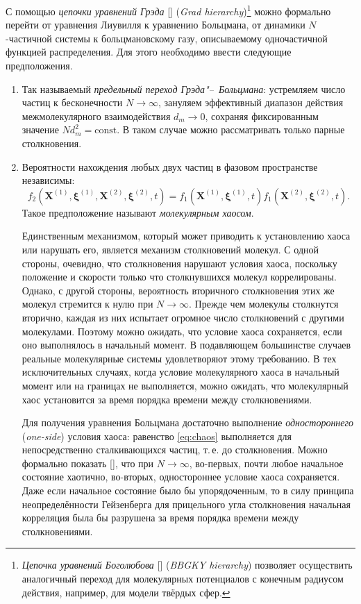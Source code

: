 С помощью \textit{цепочки уравнений Грэда} [] (\textit{Grad hierarchy})\footnote{
	\textit{Цепочка уравнений Боголюбова} [] (\textit{BBGKY hierarchy}) позволяет осуществить аналогичный переход
	для молекулярных потенциалов с конечным радиусом действия, например, для модели твёрдых сфер.
} можно формально перейти от уравнения Лиувилля к уравнению Больцмана,
от динамики \(N\)-частичной системы к больцмановскому газу, описываемому одночастичной функцией распределения.
Для этого необходимо ввести следующие предположения.
\begin{enumerate}
	\item Так называемый \textit{предельный переход Грэда"--~Больцмана}:
устремляем число частиц к бесконечности \(N\to\infty\),
зануляем эффективный диапазон действия межмолекулярного взаимодействия \(d_m\to0\),
сохраняя фиксированным значение \(Nd_m^2=\mathrm{const}\).
В таком случае можно рассматривать только парные столкновения.
	\item Вероятности нахождения любых двух частиц в фазовом пространстве независимы:
\begin{equation}\label{eq:chaos}
	f_2(\boldsymbol{X}^{(1)}, \boldsymbol{\xi}^{(1)}, \boldsymbol{X}^{(2)}, \boldsymbol{\xi}^{(2)}, t) =
	f_1(\boldsymbol{X}^{(1)}, \boldsymbol{\xi}^{(1)}, t) f_1(\boldsymbol{X}^{(2)}, \boldsymbol{\xi}^{(2)}, t).
\end{equation}
Такое предположение называют \textit{молекулярным хаосом}.

Единственным механизмом, который может приводить к установлению хаоса или нарушать его, является механизм столкновений молекул.
С одной стороны, очевидно, что столкновения нарушают условия хаоса,
поскольку положение и скорости только что столкнувшихся молекул коррелированы.
Однако, с другой стороны, вероятность вторичного столкновения этих же молекул стремится к нулю при \(N\to\infty\).
Прежде чем молекулы столкнутся вторично, каждая из них испытает огромное число столкновений с другими молекулами.
Поэтому можно ожидать, что условие хаоса сохраняется, если оно выполнялось в начальный момент.
В подавляющем большинстве случаев реальные молекулярные системы удовлетворяют этому требованию.
В тех исключительных случаях, когда условие молекулярного хаоса в начальный момент или на границах
не выполняется, можно ожидать, что молекулярный хаос установится за время порядка времени между столкновениями.

Для получения уравнения Больцмана достаточно выполнение \textit{одностороннего} (\textit{one-side}) условия хаоса:
равенство \eqref{eq:chaos} выполняется для непосредственно сталкивающихся частиц, т.\,е. до столкновения.
Можно формально показать [], что при \(N\to\infty\), во-первых, почти любое начальное состояние хаотично,
во-вторых, одностороннее условие хаоса сохраняется.
Даже если начальное состояние было бы упорядоченным, то в силу принципа неопределённости Гейзенберга для прицельного угла столкновения
начальная корреляция была бы разрушена за время порядка времени между столкновениями.


\end{enumerate}
